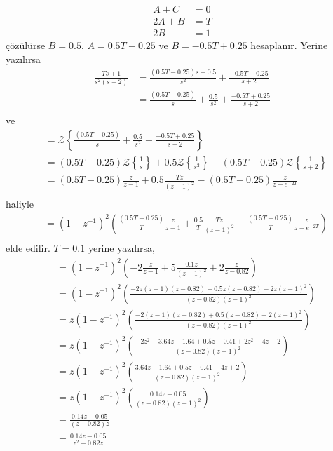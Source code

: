 \begin{enumerate}
\begin{equation}
        \begin{split}
            A+C&=0\\
            2A+B&=T\\
            2B&=1
        \end{split}
    \end{equation}
    çözülürse $B=0.5$, $A=0.5T-0.25$ ve $B=-0.5T+0.25$ hesaplanır. Yerine yazılırsa 
    \begin{equation}
        \begin{split}
            \frac{Ts+1}{s^2(s+2)}&=\frac{(0.5T-0.25)s+0.5}{s^2}+\frac{-0.5T+0.25}{s+2}\\
            &=\frac{(0.5T-0.25)}{s}+\frac{0.5}{s^2}+\frac{-0.5T+0.25}{s+2}\\
        \end{split}
    \end{equation}
    ve 
    \begin{equation}
        \begin{split}
            &=\mathcal{Z}\left\{\frac{(0.5T-0.25)}{s}+\frac{0.5}{s^2}+\frac{-0.5T+0.25}{s+2}\right\}\\
            &=(0.5T-0.25)\mathcal{Z}\left\{\frac{1}{s}\right\}+0.5\mathcal{Z}\left\{\frac{1}{s^2}\right\}-(0.5T-0.25)\mathcal{Z}\left\{\frac{1}{s+2}\right\}\\
            &=(0.5T-0.25)\frac{z}{z-1}+0.5\frac{Tz}{(z-1)^2}-(0.5T-0.25)\frac{z}{z-e^{-2T}}\\
        \end{split}
    \end{equation}
    haliyle
    \begin{equation}
        \begin{split}
            &=(1-z^{-1})^2\left(\frac{(0.5T-0.25)}{T}\frac{z}{z-1}+\frac{0.5}{T}\frac{Tz}{(z-1)^2}-\frac{(0.5T-0.25)}{T}\frac{z}{z-e^{-2T}}\right)\\
        \end{split}
    \end{equation}
    elde edilir. $T=0.1$ yerine yazılırsa,
    \begin{equation}
        \begin{split}
            &=(1-z^{-1})^2\left(-2\frac{z}{z-1}+5\frac{0.1z}{(z-1)^2}+2\frac{z}{z-0.82}\right)\\
            &=(1-z^{-1})^2\left(\frac{-2z(z-1)(z-0.82)+0.5z(z-0.82)+2z(z-1)^2}{(z-0.82)(z-1)^2}\right)\\
            &=z(1-z^{-1})^2\left(\frac{-2(z-1)(z-0.82)+0.5(z-0.82)+2(z-1)^2}{(z-0.82)(z-1)^2}\right)\\
            &=z(1-z^{-1})^2\left(\frac{-2z^2+3.64z-1.64+0.5z-0.41+2z^2-4z+2}{(z-0.82)(z-1)^2}\right)\\
            &=z(1-z^{-1})^2\left(\frac{3.64z-1.64+0.5z-0.41-4z+2}{(z-0.82)(z-1)^2}\right)\\
            &=z(1-z^{-1})^2\left(\frac{0.14z-0.05}{(z-0.82)(z-1)^2}\right)\\
            &=\frac{0.14z-0.05}{(z-0.82)z}\\
            &=\frac{0.14z-0.05}{z^2-0.82z}
        \end{split}
    \end{equation}
    

\end{enumerate}
